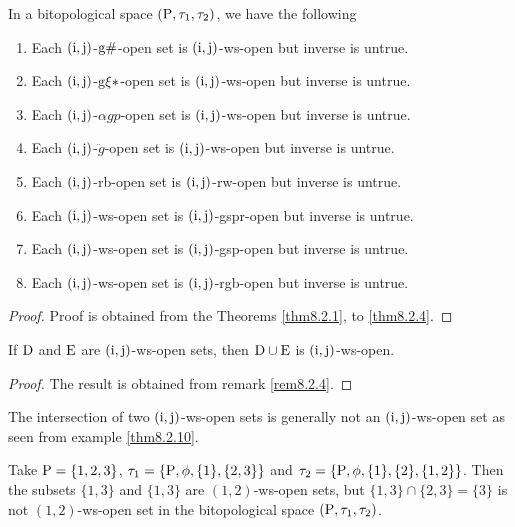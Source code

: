 \begin{thm}\label{thm8.3.1}
In a bitopological space $(\mathrm{P}, \tau_1, \tau_2 )$, we have the following
\begin{enumerate}[(1)]
\item Each $(\mathrm{i}, \mathrm{j})$-$\mathrm{g}\#$-open set is $(\mathrm{i}, \mathrm{j})$-ws-open but inverse is untrue.
\item Each $(\mathrm{i}, \mathrm{j})$-$\mathrm{g}\xi*$-open set is $(\mathrm{i}, \mathrm{j})$-ws-open but inverse is untrue.
\item Each $(\mathrm{i}, \mathrm{j})$-$\alpha gp$-open set is $(\mathrm{i}, \mathrm{j})$-ws-open but inverse is untrue.
\item Each $(\mathrm{i}, \mathrm{j})$-$\ddot{g}$-open set is $(\mathrm{i}, \mathrm{j})$-ws-open but inverse is untrue.
\item Each $(\mathrm{i}, \mathrm{j})$-rb-open set is $(\mathrm{i}, \mathrm{j})$-rw-open but inverse is untrue.
\item Each $(\mathrm{i}, \mathrm{j})$-ws-open set is $(\mathrm{i}, \mathrm{j})$-gspr-open but inverse is untrue.
\item Each $(\mathrm{i}, \mathrm{j})$-ws-open set is $(\mathrm{i}, \mathrm{j})$-gsp-open but inverse is untrue.
\item Each $(\mathrm{i}, \mathrm{j})$-ws-open set is $(\mathrm{i}, \mathrm{j})$-rgb-open but inverse is untrue.
\end{enumerate}
\end{thm}

\begin{proof}
Proof is obtained from the Theorems \ref{thm8.2.1}, to \ref{thm8.2.4}.
\end{proof}

\begin{thm}\label{thm8.3.2}
If $\mathrm{D}$ and $\mathrm{E}$ are $(\mathrm{i}, \mathrm{j})$-ws-open sets, then $\mathrm{D}\cup \mathrm{E}$ is $(\mathrm{i}, \mathrm{j})$-ws-open.
\end{thm}

\begin{proof}
The result is obtained from remark \ref{rem8.2.4}.
\end{proof}

\begin{rem}\label{rem8.3.1}
The intersection of two $(\mathrm{i}, \mathrm{j})$-ws-open sets is generally not an $(\mathrm{i}, \mathrm{j})$-ws-open set as seen from example \ref{thm8.2.10}.
\end{rem}

\begin{exm}\label{exam8.3.1}
Take $\mathrm{P}=\{ 1, 2, 3\}$, $\tau_1 =\{\mathrm{P}, \phi, \{1\}, \{2,3\}\}$ and $\tau_2 =\{\TSP, \phi, \{1\}, \{2\},\break \{1, 2\}\}$. Then the subsets $\{1, 3\}$ and $\{1, 3\}$ are $(1, 2)$-ws-open sets, but $\{1, 3\}\cap \{2,3\}=\{3\}$ is not $(1, 2)$-ws-open set in the bitopological space $(\mathrm{P}, \tau_1, \tau_2 )$.
\end{exm}


